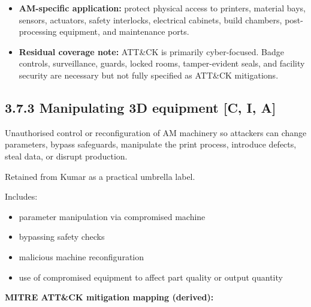 \documentclass[10pt,a4paper,oneside]{report}
\begin{document}
\begin{itemize}
\item \textbf{AM-specific application:} protect physical access to printers, material bays, sensors, actuators, safety interlocks, electrical cabinets, build chambers, post-processing equipment, and maintenance ports.
\end{itemize}

\begin{itemize}
\item \textbf{Residual coverage note:} ATT\&CK is primarily cyber-focused. Badge controls, surveillance, guards, locked rooms, tamper-evident seals, and facility security are necessary but not fully specified as ATT\&CK mitigations.
\end{itemize}


\subsection{3.7.3 Manipulating 3D equipment [C, I, A]}


Unauthorised control or reconfiguration of AM machinery so attackers can change parameters, bypass safeguards, manipulate the print process, introduce defects, steal data, or disrupt production.

Retained from Kumar as a practical umbrella label.

Includes:

\begin{itemize}
\item parameter manipulation via compromised machine
\item bypassing safety checks
\item malicious machine reconfiguration
\item use of compromised equipment to affect part quality or output quantity
\end{itemize}

\textbf{MITRE ATT\&CK mitigation mapping (derived):}
\end{document}
